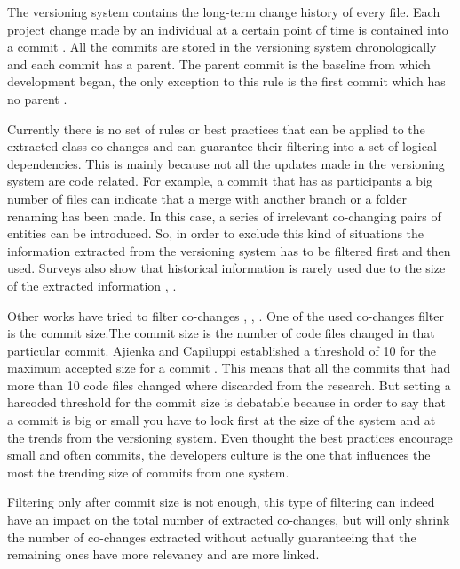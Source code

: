 \documentclass[12pt, a4paper, twoside]{report}
\begin{document}
The versioning system contains the long-term change history of every file. Each project change made by an individual at a certain point of time is contained into a commit \cite{7471284}. All the commits are stored in the versioning system chronologically and each commit has a parent. The parent commit is the baseline from which development began, the only exception to this rule is the first commit which has no parent \cite{svn}. 


Currently there is no set of rules or best practices that can be applied to the extracted class co-changes and can guarantee their filtering into a set of logical dependencies.
This is mainly because not all the updates made in the versioning system are code related. For example, a commit that has as participants a big number of files can indicate that a merge with another branch or a folder renaming has been made. In this case, a series of irrelevant co-changing pairs of entities can be introduced. So, in order to exclude this kind of situations the information extracted from the versioning system has to be filtered first and then used. Surveys also show that historical information is rarely used due to the size of the extracted information \cite{Shtern:2012:CMS:2332427.2332428}, \cite{sar}.

Other works have tried to filter co-changes \cite{Oliva:2011:ISL:2067853.2068086}, \cite{DBLP:journals/jss/AjienkaC17}, \cite{DBLP:conf/issre/OlivaG15}. One of the used co-changes filter is the commit size.The commit size is the number of code files changed in that particular commit. 
Ajienka and Capiluppi established a threshold of 10 for the maximum accepted size for a commit \cite{DBLP:journals/jss/AjienkaC17}. This means that all the commits that had more than 10 code files changed where discarded from the research. But setting a harcoded threshold for the commit size is debatable because in order to say that a commit is big or small you have to look first at the size of the system and at the trends from the versioning system. Even thought the best practices encourage small and often commits, the developers culture is the one that influences the most the trending size of commits from one system.

Filtering only after commit size is not enough, this type of filtering can indeed have an impact on the total number of extracted co-changes, but will only shrink the number of co-changes extracted without actually guaranteeing that the remaining ones have more relevancy and are more linked.
\end{document}
